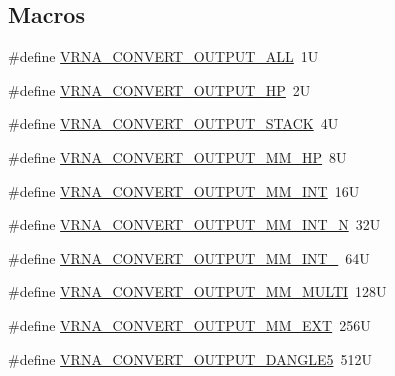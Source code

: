 \subsection*{Macros}
\begin{DoxyCompactItemize}
\item 
\#define \hyperlink{group__energy__parameters__convert_ga8dc6aee5a806c49b71557152f9616bc4}{V\-R\-N\-A\-\_\-\-C\-O\-N\-V\-E\-R\-T\-\_\-\-O\-U\-T\-P\-U\-T\-\_\-\-A\-L\-L}~1\-U
\item 
\#define \hyperlink{group__energy__parameters__convert_gaf66fe2cb11dfcfd32d791049c254a8a4}{V\-R\-N\-A\-\_\-\-C\-O\-N\-V\-E\-R\-T\-\_\-\-O\-U\-T\-P\-U\-T\-\_\-\-H\-P}~2\-U
\item 
\#define \hyperlink{group__energy__parameters__convert_gad23522d63f8d4c50d5a5deee9bee3ef2}{V\-R\-N\-A\-\_\-\-C\-O\-N\-V\-E\-R\-T\-\_\-\-O\-U\-T\-P\-U\-T\-\_\-\-S\-T\-A\-C\-K}~4\-U
\item 
\#define \hyperlink{group__energy__parameters__convert_gaa892c7b4957459090f3e08da298cc347}{V\-R\-N\-A\-\_\-\-C\-O\-N\-V\-E\-R\-T\-\_\-\-O\-U\-T\-P\-U\-T\-\_\-\-M\-M\-\_\-\-H\-P}~8\-U
\item 
\#define \hyperlink{group__energy__parameters__convert_ga4ff223fb1f9c62cd92d9ab811ad03d55}{V\-R\-N\-A\-\_\-\-C\-O\-N\-V\-E\-R\-T\-\_\-\-O\-U\-T\-P\-U\-T\-\_\-\-M\-M\-\_\-\-I\-N\-T}~16\-U
\item 
\#define \hyperlink{group__energy__parameters__convert_gaf5d3743219f83c6348155cd81e755bbb}{V\-R\-N\-A\-\_\-\-C\-O\-N\-V\-E\-R\-T\-\_\-\-O\-U\-T\-P\-U\-T\-\_\-\-M\-M\-\_\-\-I\-N\-T\-\_\-N}~32\-U
\item 
\#define \hyperlink{group__energy__parameters__convert_ga78382ec622ba99e0ac2262317bdd7316}{V\-R\-N\-A\-\_\-\-C\-O\-N\-V\-E\-R\-T\-\_\-\-O\-U\-T\-P\-U\-T\-\_\-\-M\-M\-\_\-\-I\-N\-T\-\_}~64\-U
\item 
\#define \hyperlink{group__energy__parameters__convert_gae67af9f1cdf7baf2865481282a5d1034}{V\-R\-N\-A\-\_\-\-C\-O\-N\-V\-E\-R\-T\-\_\-\-O\-U\-T\-P\-U\-T\-\_\-\-M\-M\-\_\-\-M\-U\-L\-T\-I}~128\-U
\item 
\#define \hyperlink{group__energy__parameters__convert_gaf14ead7ef1fdbe725ade653750fc51e3}{V\-R\-N\-A\-\_\-\-C\-O\-N\-V\-E\-R\-T\-\_\-\-O\-U\-T\-P\-U\-T\-\_\-\-M\-M\-\_\-\-E\-X\-T}~256\-U
\item 
\#define \hyperlink{group__energy__parameters__convert_ga036ffd996d8c8a9acf631760dd1da24b}{V\-R\-N\-A\-\_\-\-C\-O\-N\-V\-E\-R\-T\-\_\-\-O\-U\-T\-P\-U\-T\-\_\-\-D\-A\-N\-G\-L\-E5}~512\-U
\item 

\end{DoxyCompactItemize}
